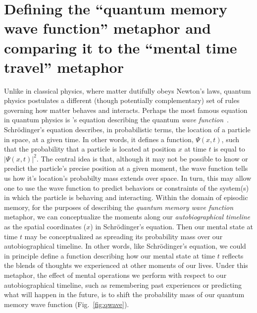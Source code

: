 \documentclass{article}
\begin{document}
\section*{Defining the ``quantum memory wave function'' metaphor and comparing it to the ``mental time travel'' metaphor}
Unlike in classical physics, where matter dutifully obeys Newton's laws, quantum physics postulates a different (though potentially complementary) set of rules governing how matter behaves and interacts.  Perhaps the most famous equation in quantum physics is \cite{Schr26}'s equation describing the quantum \textit{wave function}~\citep[this finding was also inspired by][]{deBr24}.  Schr\"{o}dinger's equation describes, in probabilistic terms, the location of a particle in space, at a given time.  In other words, it defines a function, $\Psi(x, t)$, such that the probability that a particle is located at position $x$ at time $t$ is equal to $|\Psi(x, t)|^2$.  The central idea is that, although it may not be possible to know or predict the particle's precise position at a given moment, the wave function tells us how it's location's probabilty mass extends over space.  In turn, this may allow one to use the wave function to predict behaviors or constraints of the system(s) in which the particle is behaving and interacting.  Within the domain of episodic memory, for the purposes of describing the \textit{quantum memory wave function} metaphor, we can conceptualize the moments along our \textit{autobiographical timeline} as the spatial coordinates ($x$) in Schr\"{o}dinger's equation.  Then our mental state at time $t$ may be conceptualized as spreading its probability mass over our autobiographical timeline.  In other words, like Schr\"{o}dinger's equation, we could in principle define a function describing how our mental state at time $t$ reflects the blends of thoughts we experienced at other moments of our lives.  Under this metaphor, the effect of mental operations we perform with respect to our autobiographical timeline, such as remembering past experiences or predicting what will happen in the future, is to shift the probability mass of our quantum memory wave function (Fig.~\ref{fig:qwave}).
\end{document}
